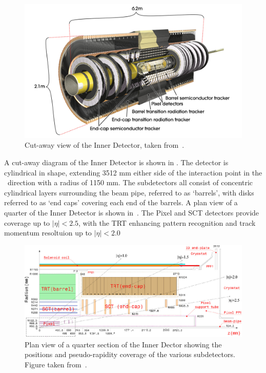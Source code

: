 \begin{figure}[h]
\centering
\includegraphics[width=\textwidth]{ID_newTRT_d3}
\caption{Cut-away view of the Inner Detector, taken from~\cite{Aad:1125884}.}
\label{fig:id-1}
\end{figure}

A cut-away diagram of the Inner Detector is shown in . The detector
is cylindrical in shape, extending 3512 mm either side of the interaction point
in the \z\ direction with a radius of 1150 mm. The subdetectors all consist of
concentric cylindrical layers surrounding the beam pipe, referred to as
`barrels', with disks referred to as `end caps' covering each end of the
barrels. A plan view of a quarter of the Inner Detector is shown
in~. The Pixel and SCT detectors provide coverage up to $|\eta|<2.5$,
with the TRT enhancing pattern recognition and track momentum resoltuion up to
$|\eta|<2.0$

\begin{figure}[h]
\centering
\includegraphics[width=\textwidth]{FigID26-mod-011107_crop}
\caption{Plan view of a quarter section of the Inner Dector showing the
positions and pseudo-rapidity coverage of the various subdetectors. Figure taken from~\cite{Aad:1125884}.}
\label{fig:id-plan}
\end{figure}

